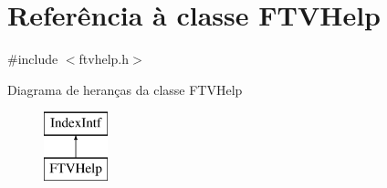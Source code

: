 \hypertarget{class_f_t_v_help}{\section{Referência à classe F\-T\-V\-Help}
\label{class_f_t_v_help}
}


{\ttfamily \#include $<$ftvhelp.\-h$>$}

Diagrama de heranças da classe F\-T\-V\-Help\begin{figure}[H]
\begin{center}
\leavevmode
\includegraphics[height=2.000000cm]{class_f_t_v_help}
\end{center}
\end{figure}
